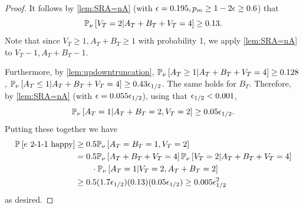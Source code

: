 \begin{proof}
It follows by \cref{lem:SRA=nA} (with ${\epsilon}=0.195, p_m\geq 1-2{\epsilon}\geq 0.6$) that 
$${\mathbb{P}}_{\nu}\left[V_T=2 | A_T+B_T+V_T=4\right] \geq 0.13.$$
Note that since $V_T\geq 1, A_T+B_T\geq 1$ with probability 1, we apply \cref{lem:SRA=nA} to $V_T-1, A_T+B_T-1$.

Furthermore, by \cref{lem:updowntruncation}, ${\mathbb{P}}_{\nu}\left[A_T\geq 1 | A_T+B_T+V_T=4\right] \geq 0.128$, ${\mathbb{P}}_{\nu}\left[A_T\leq 1 | A_T+B_T+V_T=4\right] \geq 0.43{\epsilon}_{1/2}$. The same holds for $B_T$. Therefore, by \cref{lem:SRA=nA} (with ${\epsilon}=0.055{\epsilon}_{1/2}$), using that ${\epsilon}_{1/2}<0.001$,
$${\mathbb{P}}_{\nu}\left[A_T=1 | A_T+B_T=2, V_T=2\right] \geq 0.05{\epsilon}_{1/2}.$$
Putting these together we have
\begin{align*} {\mathbb{P}}\left[e\text{ 2-1-1 happy}\right] &\geq 0.5 {\mathbb{P}}_{\nu}\left[A_T=B_T=1,V_T=2\right] \\
&= 0.5{\mathbb{P}}_{\nu}\left[A_T+B_T+V_T=4\right]{\mathbb{P}}_{\nu}\left[V_T=2|A_T+B_T+V_T=4\right]\\
&\quad \quad \cdot {\mathbb{P}}_{\nu}\left[A_T=1| V_T=2,A_T+B_T=2\right]\\
&\geq 0.5 (1.7{\epsilon}_{1/2})(0.13)(0.05{\epsilon}_{1/2}) \geq  0.005{\epsilon}_{1/2}^2
\end{align*}
as desired.
\end{proof}


